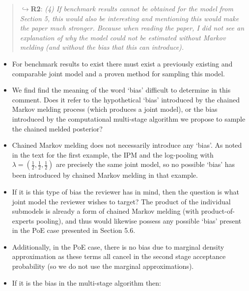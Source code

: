 \documentclass[
  10pt,
  a4paper,
]{article}
\begin{document}
\begin{quote}
\(\hookrightarrow\)\textbf{R2}: \emph{(4) If benchmark results cannot be
obtained for the model from Section 5, this would also be interesting
and mentioning this would make the paper much stronger. Because when
reading the paper, I did not see an explanation of why the model could
not be estimated without Markov melding (and without the bias that this
can introduce).}
\end{quote}

\begin{itemize}
\item
  For benchmark results to exist there must exist a previously existing
  and comparable joint model and a proven method for sampling this
  model.
\item
  We find find the meaning of the word `bias' difficult to determine in
  this comment. Does it refer to the hypothetical `bias' introduced by
  the chained Markov melding process (which produces a joint model), or
  the bias introduced by the computational multi-stage algorithm we
  propose to sample the chained melded posterior?
\item
  Chained Markov melding does not necessarily introduce any `bias'. As
  noted in the text for the first example, the IPM and the log-pooling
  with \(\lambda = (\frac{1}{2}, \frac{1}{2}, \frac{1}{2})\) are
  precisely the same joint model, so no possible `bias' has been
  introduced by chained Markov melding in that example.
\item
  If it is this type of bias the reviewer has in mind, then the question
  is what joint model the reviewer wishes to target? The product of the
  individual submodels is already a form of chained Markov melding (with
  product-of-experts pooling), and thus would likewise possess any
  possible `bias' present in the PoE case presented in Section 5.6.
\item
  Additionally, in the PoE case, there is no bias due to marginal
  density approximation as these terms all cancel in the second stage
  acceptance probability (so we do not use the marginal approximations).
\item
  If it is the bias in the multi-stage algorithm then:


\end{itemize}
\end{document}
